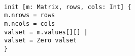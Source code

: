 \begin{myquote}\small{\texttt{\\
\Bpred init [m: Matrix, rows, cols: Int] \{\\
\TA m.nrows = rows\\
\TA m.ncols = cols\\
\TA \Blet valset = m.values[\Buniv][\Buniv] |\\
\TB valset = Zero \Bor \Bno valset\\
\}
}}
\end{myquote}